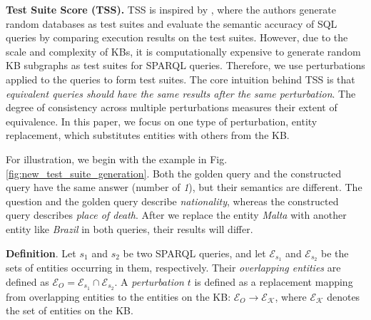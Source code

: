\documentclass[runningheads]{llncs}
\begin{document}
\noindent \textbf{Test Suite Score (TSS).} 
TSS is inspired by \cite{zhong2020semanticsql}, where the authors generate random databases as test suites and evaluate the semantic accuracy of SQL queries by comparing execution results on the test suites. 
However, due to the scale and complexity of KBs, it is computationally expensive to generate random KB subgraphs as test suites for SPARQL queries. Therefore, we use perturbations applied to the queries to form test suites.
The core intuition behind TSS is that \textit{equivalent queries should have the same results after the same perturbation}. The degree of consistency across multiple perturbations measures their extent of equivalence. 
In this paper, we focus on one type of perturbation, entity replacement, which substitutes entities with others from the KB.

For illustration, we begin with the example in Fig.\ref{fig:new_test_suite_generation}. Both the golden query and the constructed query have the same answer (number of \textit{1}), but their semantics are different. The question and the golden query describe \textit{nationality}, whereas the constructed query describes \textit{place of death}. After we replace the entity \textit{Malta} with another entity like \textit{Brazil} in both queries, their results will differ. 


\textbf{Definition}.
Let $s_1$ and $s_2$ be two SPARQL queries, and let $\mathcal{E}_{s_1}$ and $\mathcal{E}_{s_2}$ be the sets of entities occurring in them, respectively. Their \textit{overlapping entities} are defined as $\mathcal{E}_O = \mathcal{E}_{s_1} \cap \mathcal{E}_{s_2}$.
A \textit{perturbation} $t$ is defined as a replacement mapping from overlapping entities to the entities on the KB: $\mathcal{E}_O \rightarrow \mathcal{E}_{\mathcal{K}}$, 
where $\mathcal{E}_{\mathcal{K}}$ denotes the set of entities on the KB. 
\end{document}
